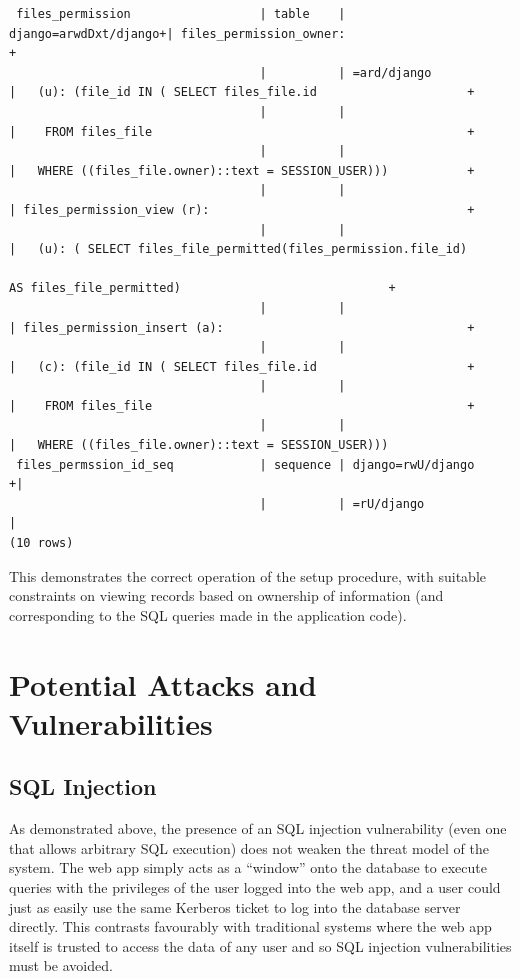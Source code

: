 \documentclass{report}
\begin{document}
\begin{landscape}
{\begin{verbatim}
 files_permission                  | table    | django=arwdDxt/django+| files_permission_owner:                                       +
                                   |          | =ard/django           |   (u): (file_id IN ( SELECT files_file.id                     +
                                   |          |                       |    FROM files_file                                            +
                                   |          |                       |   WHERE ((files_file.owner)::text = SESSION_USER)))           +
                                   |          |                       | files_permission_view (r):                                    +
                                   |          |                       |   (u): ( SELECT files_file_permitted(files_permission.file_id)
                                                                                 AS files_file_permitted)                             +
                                   |          |                       | files_permission_insert (a):                                  +
                                   |          |                       |   (c): (file_id IN ( SELECT files_file.id                     +
                                   |          |                       |    FROM files_file                                            +
                                   |          |                       |   WHERE ((files_file.owner)::text = SESSION_USER)))
 files_permssion_id_seq            | sequence | django=rwU/django    +|
                                   |          | =rU/django            |
(10 rows)
\end{verbatim}
  }

  This demonstrates the correct operation of the setup procedure, with suitable constraints on viewing records based on ownership of information (and corresponding to the SQL queries made in the application code).

\end{landscape}

\section{Potential Attacks and Vulnerabilities}

\subsection{SQL Injection}
As demonstrated above, the presence of an SQL injection vulnerability (even one that allows arbitrary SQL execution) does not weaken the threat model of the system. The web app simply acts as a ``window'' onto the database to execute queries with the privileges of the user logged into the web app, and a user could just as easily use the same Kerberos ticket to log into the database server directly. This contrasts favourably with traditional systems where the web app itself is trusted to access the data of any user and so SQL injection vulnerabilities must be avoided.
\end{document}
